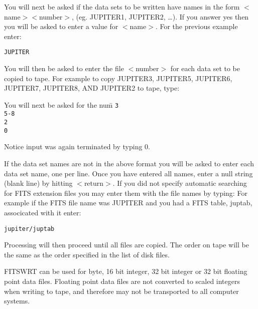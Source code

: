You will next be asked if the data sets to be written have names in the
form $<$name$><$number$>$, (eg. JUPITER1, JUPITER2, \ldots).  If you answer
yes then you will be asked to enter a value for $<$name$>$.  For the previous
example enter:
\begin{center}
{\tt JUPITER}
\end{center}
You will then be asked to enter the file $<$number$>$ for each data set to
be copied to tape.  For example to copy JUPITER3,
JUPITER5, JUPITER6, JUPITER7, JUPITER8, AND JUPITER2 to tape, type: \\
\begin{tabbing}
You will next be asked for the num\=   \kill
\> {\tt 3} \\
\> {\tt 5-8} \\
\> {\tt 2} \\
\> {\tt 0} 
\end{tabbing}
Notice input was again terminated by typing 0.

If the data set names are not in the above format you will be asked
to enter each data set name, one per line.  
Once you have entered all names, enter a null string (blank line)
by hitting $<$return$>$.
If you did not specify automatic searching for FITS extension
files you may enter them with the file names by typing:
For example if the FITS file name was JUPITER and you had
a FITS table, juptab, associcated with it enter: 
\begin{center}
{\tt jupiter/juptab} 
\end{center}
Processing will then proceed until all files are copied.
The order on tape will be the same as the order specified in the list of
disk files.

FITSWRT can be used for byte, 16 bit integer, 32 bit integer or 32 bit
floating point data files.  Floating point data files are not converted
to scaled integers when writing to tape, and therefore may not be transported
to all computer systems.

